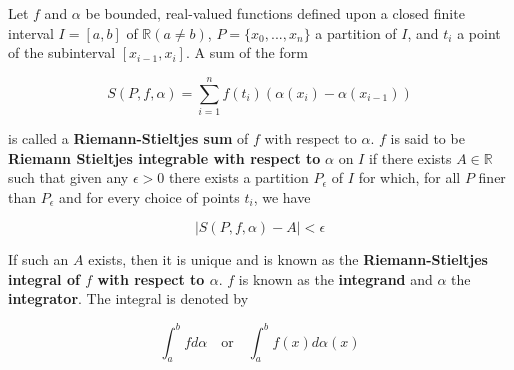 \documentclass[12pt]{article}
\begin{document}
Let $f$ and $\alpha$ be bounded, real-valued functions defined upon a closed finite interval $I = [ a, b ]$ of $\mathbb{R} (a \neq b)$, $P = \{ x_{0}, ..., x_{n} \}$ a partition of $I$, and $t_{i}$ a point of the subinterval $[ x_{i - 1}, x_{i} ]$. A sum of the form

$$S(P, f, \alpha) = \sum_{i = 1}^{n} f(t_{i}) (\alpha(x_{i}) - \alpha(x_{i - 1}))$$

is called a \textbf{Riemann-Stieltjes sum} of $f$ with respect to $\alpha$. $f$ is said to be \textbf{Riemann Stieltjes integrable with respect to} $\alpha$ on $I$ if there exists $A \in \mathbb{R}$ such that given any $\epsilon > 0$ there exists a partition $P_{\epsilon}$ of $I$ for which, for all $P$ finer than $P_{\epsilon}$ and for every choice of points $t_{i}$, we have


$$|S(P, f, \alpha) - A| < \epsilon$$


If such an $A$ exists, then it is unique and is known as the \textbf{Riemann-Stieltjes integral of $f$ with respect to $\alpha$}. $f$ is known as the \textbf{integrand} and $\alpha$ the \textbf{integrator}. The integral is denoted by


$$\int_{a}^{b}fd\alpha \quad \textrm{or} \quad \int_{a}^{b}f(x)d\alpha(x)$$

\end{document}
